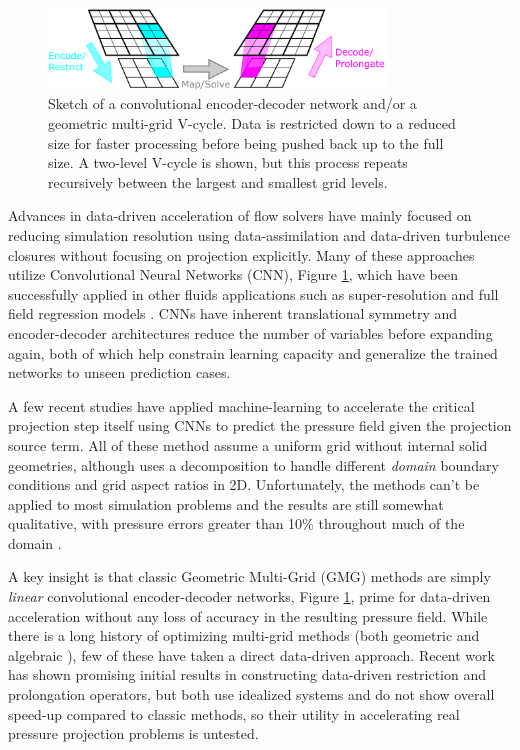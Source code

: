 \documentclass[review]{elsarticle}
\begin{document}
\begin{figure}
    \centering
    \includegraphics[width=0.8\textwidth]{figures/drawing}
    \caption{Sketch of a convolutional encoder-decoder network and/or a geometric multi-grid V-cycle. Data is restricted down to a reduced size for faster processing before being pushed back up to the full size. A two-level V-cycle is shown, but this process repeats recursively between the largest and smallest grid levels.}
    \label{fig:multigrid}
\end{figure}

Advances in data-driven acceleration of flow solvers have mainly focused on reducing simulation resolution using data-assimilation and data-driven turbulence closures \cite{asch2016data,BECK2019108910,maulik_san_rasheed_vedula_2019,ling_kurzawski_templeton_2016,font2021deep} without focusing on projection explicitly. Many of these approaches utilize Convolutional Neural Networks (CNN), Figure \ref{fig:multigrid}, which have been successfully applied in other fluids applications such as super-resolution \cite{liu2020deep} and full field regression models \cite{bhatnagar2019prediction}. CNNs have inherent translational symmetry and encoder-decoder architectures reduce the number of variables before expanding again, both of which help constrain learning capacity and generalize the trained networks to unseen prediction cases. 

A few recent studies have applied machine-learning to accelerate the critical projection step itself \cite{ozbay2021poisson,Xiao2020,ajuria2020} using CNNs to predict the pressure field given the projection source term. All of these method assume a uniform grid without internal solid geometries, although \cite{ozbay2021poisson} uses a decomposition to handle different \textit{domain} boundary conditions and grid aspect ratios in 2D. Unfortunately, the methods can't be applied to most simulation problems and the results are still somewhat qualitative, with pressure errors greater than 10\% throughout much of the domain \cite{ozbay2021poisson}. 

A key insight is that classic Geometric Multi-Grid (GMG) methods \cite{briggs2000multigrid} are simply \textit{linear} convolutional encoder-decoder networks, Figure \ref{fig:multigrid}, prime for data-driven acceleration without any loss of accuracy in the resulting pressure field. While there is a long history of optimizing multi-grid methods (both geometric \cite{oosterlee2003genetic} and algebraic \cite{brezina2006adaptive}), few of these have taken a direct data-driven approach. Recent work \cite{KATRUTSA2020112524,greenfeld2019learning} has shown promising initial results in constructing data-driven restriction and prolongation operators, but both use idealized systems and do not show overall speed-up compared to classic methods, so their utility in accelerating real pressure projection problems is untested.
\end{document}
